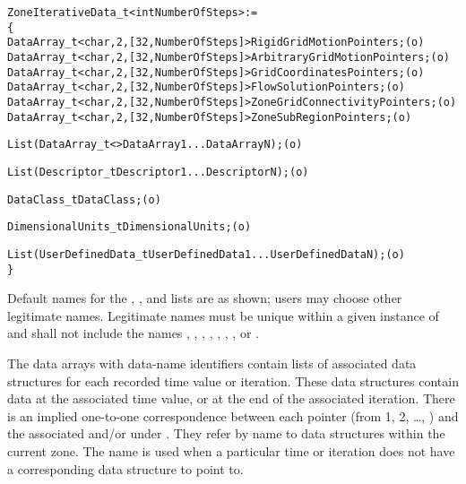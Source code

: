 \begin{alltt}
  ZoneIterativeData\_t< int NumberOfSteps > :=
    \{
    DataArray\_t<char, 2, [32, NumberOfSteps]> RigidGridMotionPointers ;     (o)
    DataArray\_t<char, 2, [32, NumberOfSteps]> ArbitraryGridMotionPointers ; (o)
    DataArray\_t<char, 2, [32, NumberOfSteps]> GridCoordinatesPointers ;     (o)
    DataArray\_t<char, 2, [32, NumberOfSteps]> FlowSolutionPointers ;        (o)
    DataArray\_t<char, 2, [32, NumberOfSteps]> ZoneGridConnectivityPointers ;(o)
    DataArray\_t<char, 2, [32, NumberOfSteps]> ZoneSubRegionPointers ;       (o)

    List( DataArray\_t<> DataArray1 ... DataArrayN ) ;                       (o)

    List( Descriptor\_t Descriptor1 ... DescriptorN ) ;                      (o)

    DataClass\_t DataClass ;                                                 (o)

    DimensionalUnits\_t DimensionalUnits ;                                   (o)

    List( UserDefinedData\_t UserDefinedData1 ... UserDefinedDataN ) ;       (o)
    \}
\end{alltt}

\begin{notes}
\item Default names for the , , and
      lists are as shown; users may choose other legitimate names.
      Legitimate names must be unique within a given
      instance of  and shall not
      include the names ,
      , ,
      , ,
      , , or
      .
\end{notes}

The data arrays with data-name identifiers 
contain lists of associated data structures for each recorded time value
or iteration.
These data structures contain data at the associated time value, or at
the end of the associated iteration.
There is an implied one-to-one correspondence between each pointer (from
1, 2, \ldots, ) and the associated 
and/or  under .
They refer by name to data structures within the current zone.
The name  is used when a particular time or iteration
does not have a corresponding data structure to point to.

